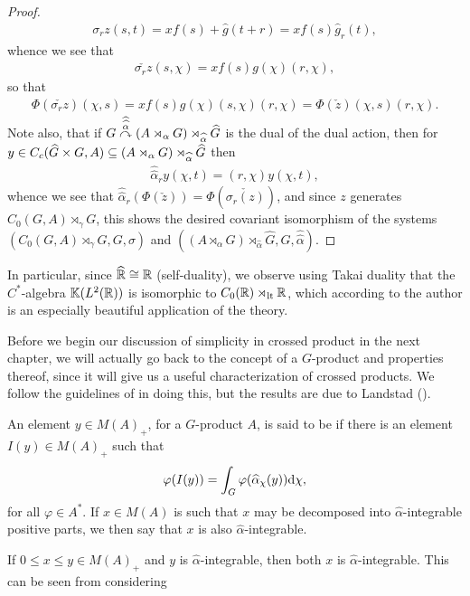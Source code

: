 \begin{proof}
\begin{align*}
	\sigma_r z(s,t) = x f(s) + \hat g(t+r) = x f(s) \hat g_r(t),
\end{align*}
whence we see that
\begin{align*}
	\check{ \sigma_r z}(s,\chi) = x f(s) g(\chi) (r,\chi),
\end{align*}
so that
\begin{align*}
\Phi(\check{ \sigma_r z})(\chi,s) = x f(s) g(\chi)(s,\chi)(r,\chi) = \Phi(\check z)(\chi,s) (r,\chi).
\end{align*}
Note also, that if $G \stackrel{\widehat{\widehat{\alpha}}}{\curvearrowright} (A \rtimes_\alpha G) \rtimes_{\widehat{\alpha}} \widehat{G}$ is the dual of the dual action, then for $y \in C_c(\widehat{G} \times G, A) \subseteq (A \rtimes_\alpha G) \rtimes_{\widehat{\alpha}} \widehat{G}$ then
\begin{align*}
	\hat{\hat{\alpha}}_r y(\chi,t) = (r,\chi) y(\chi,t),
\end{align*}
whence we see that $\hat{\hat{\alpha}}_r(\Phi(\check z))= \Phi(\check{\sigma_r (z)})$, and since $z$ generates $C_0(G,A) \rtimes_\gamma G$, this shows the desired covariant isomorphism of the systems $(C_0(G,A) \rtimes_\gamma G, G, \sigma)$ and $( (A \rtimes_\alpha G)\rtimes_{\hat{\alpha}} \hat G, G, \hat{\hat{\alpha}})$.
\end{proof}
In particular, since $\widehat{\mathbb{R}} \cong \mathbb{R}$ (self-duality), we observe using Takai duality that the $C^*$-algebra $\mathbb{K}(L^2(\mathbb{R}))$ is isomorphic to $C_0(\mathbb{R}) \rtimes_\mathrm{lt} \mathbb{R} $, which according to the author is an especially beautiful application of the theory.

Before we begin our discussion of simplicity in crossed product in the next chapter, we will actually go back to the concept of a $G$-product and properties thereof, since it will give us a useful characterization of crossed products. We follow the guidelines of \cite{olesenpedersen1} in doing this, but the results are due to Landstad (\cite{landstad1979duality}).
\begin{definition}
	An element $y \in M(A)_+$, for a $G$-product $A$, is said to be  if there is an element $I(y) \in M(A)_+$ such that
	\begin{align*}
		\varphi(I(y)) = \int_G \varphi(\widehat{\alpha}_\chi (y)) \mathrm{d} \chi,
	\end{align*}
	for all $\varphi \in A^*$. If $x \in M(A)$ is such that $x$ may be decomposed into $\hat \alpha$-integrable positive parts, we then say that $x$ is also $\hat \alpha$-integrable.
\end{definition}
\begin{note}
	If $0 \leq x \leq y \in M(A)_+$ and $y$ is $\hat \alpha$-integrable, then both $x$ is $\hat \alpha$-integrable. This can be seen from considering  
\end{note}


